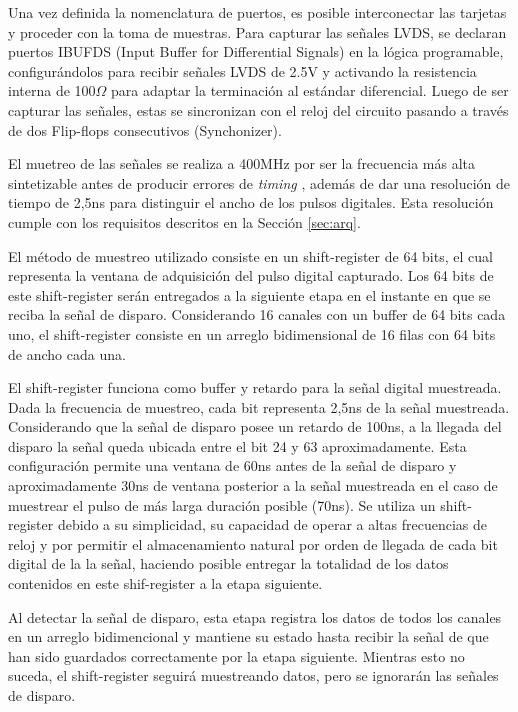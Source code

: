 	Una vez definida la nomenclatura de puertos, es posible interconectar las tarjetas y proceder con la toma de muestras. Para capturar las señales LVDS, se declaran puertos IBUFDS (Input Buffer for Differential Signals) en la lógica programable, configurándolos para recibir señales LVDS de 2.5V y activando la resistencia interna de 100$\Omega$ para adaptar la terminación al estándar diferencial. Luego de ser capturar las señales, estas se sincronizan con el reloj del circuito pasando a través de dos Flip-flops consecutivos (Synchonizer).
	
	El muetreo  de las señales se realiza a 400MHz por ser la frecuencia más alta sintetizable antes de producir errores de \textit{timing} , además de dar una resolución de tiempo de 2,5ns para distinguir el ancho de los pulsos digitales. Esta resolución cumple con los requisitos descritos en la Sección \ref{sec:arq}.
	
	El método de muestreo utilizado consiste en un shift-register de 64 bits, el cual representa la ventana de adquisición del pulso digital capturado. Los 64 bits de este shift-register serán entregados a la siguiente etapa en el instante en que se reciba la señal de disparo. Considerando 16 canales con un buffer de 64 bits cada uno, el shift-register consiste en un arreglo bidimensional de 16 filas con 64 bits de ancho cada una.
	
	El shift-register funciona como buffer y retardo para la señal digital muestreada. Dada la frecuencia de muestreo, cada bit representa 2,5ns de la señal muestreada. Considerando que la señal de disparo posee un retardo de 100ns, a la llegada del disparo la señal queda ubicada entre el bit 24 y 63 aproximadamente. Esta configuración permite una ventana de 60ns antes de la señal de disparo y aproximadamente 30ns de ventana posterior a la señal muestreada en el caso de muestrear el pulso de más larga duración posible (70ns). Se utiliza un shift-register debido a su simplicidad, su capacidad de operar a altas frecuencias de reloj y por permitir el almacenamiento natural por orden de llegada de cada bit digital de la la señal, haciendo posible entregar la totalidad de los datos contenidos en este shif-register a la etapa siguiente.
	
	Al detectar la señal de disparo, esta etapa registra los datos de todos los canales en un arreglo bidimencional y mantiene su estado hasta recibir la señal de que han sido guardados correctamente por la etapa siguiente. Mientras esto no suceda, el shift-register seguirá muestreando datos, pero se ignorarán las señales de disparo.
	
